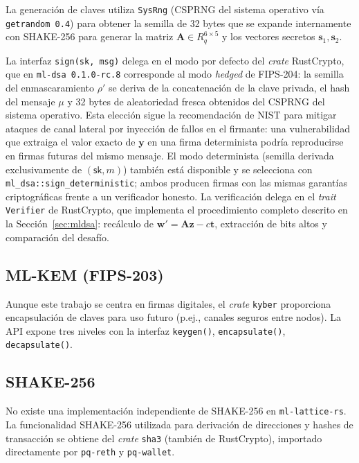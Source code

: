 La generación de claves utiliza \texttt{SysRng} (CSPRNG del sistema operativo vía \texttt{getrandom 0.4}) para obtener la semilla de 32 bytes que se expande internamente con SHAKE-256 para generar la matriz $\mathbf{A} \in R_q^{6 \times 5}$ y los vectores secretos $\mathbf{s}_1, \mathbf{s}_2$.

La interfaz \texttt{sign(sk, msg)} delega en el modo por defecto del \emph{crate} RustCrypto, que en \texttt{ml-dsa 0.1.0-rc.8} corresponde al modo \emph{hedged} de FIPS-204: la semilla del enmascaramiento $\rho'$ se deriva de la concatenación de la clave privada, el hash del mensaje $\mu$ y 32 bytes de aleatoriedad fresca obtenidos del CSPRNG del sistema operativo. Esta elección sigue la recomendación de NIST para mitigar ataques de canal lateral por inyección de fallos en el firmante: una vulnerabilidad que extraiga el valor exacto de $\mathbf{y}$ en una firma determinista podría reproducirse en firmas futuras del mismo mensaje. El modo determinista (semilla derivada exclusivamente de $(\textsf{sk}, m)$) también está disponible y se selecciona con \texttt{ml\_dsa::sign\_deterministic}; ambos producen firmas con las mismas garantías criptográficas frente a un verificador honesto. La verificación delega en el \emph{trait} \texttt{Verifier} de RustCrypto, que implementa el procedimiento completo descrito en la Sección~\ref{sec:mldsa}: recálculo de $\mathbf{w}' = \mathbf{A}\mathbf{z} - c\mathbf{t}$, extracción de bits altos y comparación del desafío.

\subsection{ML-KEM (FIPS-203)}

Aunque este trabajo se centra en firmas digitales, el \emph{crate} \texttt{kyber} proporciona encapsulación de claves para uso futuro (p.ej., canales seguros entre nodos). La API expone tres niveles con la interfaz \texttt{keygen()}, \texttt{encapsulate()}, \texttt{decapsulate()}.

\subsection{SHAKE-256}

No existe una implementación independiente de SHAKE-256 en \texttt{ml-lattice-rs}. La funcionalidad SHAKE-256 utilizada para derivación de direcciones y hashes de transacción se obtiene del \emph{crate} \texttt{sha3} (también de RustCrypto), importado directamente por \texttt{pq-reth} y \texttt{pq-wallet}.


